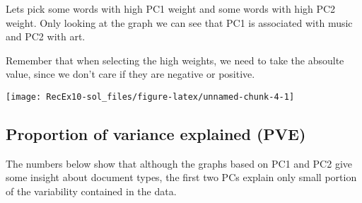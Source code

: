 \documentclass[
]{article}
\newenvironment{Shaded}{\begin{snugshade}}{\end{snugshade}}
\newcommand{\AttributeTok}[1]{\textcolor[rgb]{0.13,0.29,0.53}{#1}}
\newcommand{\ConstantTok}[1]{\textcolor[rgb]{0.56,0.35,0.01}{#1}}
\newcommand{\DecValTok}[1]{\textcolor[rgb]{0.00,0.00,0.81}{#1}}
\newcommand{\FunctionTok}[1]{\textcolor[rgb]{0.13,0.29,0.53}{\textbf{#1}}}
\newcommand{\NormalTok}[1]{#1}
\newcommand{\OtherTok}[1]{\textcolor[rgb]{0.56,0.35,0.01}{#1}}
\newcommand{\SpecialCharTok}[1]{\textcolor[rgb]{0.81,0.36,0.00}{\textbf{#1}}}
\begin{document}
Lets pick some words with high PC1 weight and some words with high PC2
weight. Only looking at the graph we can see that PC1 is associated with
music and PC2 with art.

Remember that when selecting the high weights, we need to take the
absoulte value, since we don't care if they are negative or positive.

\begin{Shaded}
\end{Shaded}

\begin{center}\texttt{[image: RecEx10-sol\_files/figure-latex/unnamed-chunk-4-1]} \end{center}

\subsection{Proportion of variance explained
(PVE)}\label{proportion-of-variance-explained-pve}

The numbers below show that although the graphs based on PC1 and PC2
give some insight about document types, the first two PCs explain only
small portion of the variability contained in the data.

\begin{Shaded}
\end{Shaded}
\end{document}
